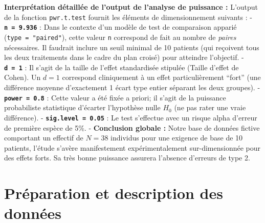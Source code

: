 \documentclass[
  letterpaper,
  DIV=11,
  numbers=noendperiod]{scrartcl}
\begin{document}
\textbf{Interprétation détaillée de l'output de l'analyse de puissance
:} L'output de la fonction \texttt{pwr.t.test} fournit les éléments de
dimensionnement suivants : - \textbf{\texttt{n\ =\ 9.936}} : Dans le
contexte d'un modèle de test de comparaison apparié
(\texttt{type\ =\ "paired"}), cette valeur \texttt{n} correspond de fait
au nombre de \emph{paires} nécessaires. Il faudrait inclure un seuil
minimal de 10 patients (qui reçoivent tous les deux traitements dans le
cadre du plan croisé) pour atteindre l'objectif. -
\textbf{\texttt{d\ =\ 1}} : Il s'agit de la taille de l'effet
standardisée stipulée (Taille d'effet de Cohen). Un \(d=1\) correspond
cliniquement à un effet particulièrement ``fort'' (une différence
moyenne d'exactement 1 écart type entier séparant les deux groupes). -
\textbf{\texttt{power\ =\ 0.8}} : Cette valeur a été fixée a priori; il
s'agit de la puissance probabiliste statistique d'écarter l'hypothèse
nulle \(H_0\) (ne pas rater une vraie différence). -
\textbf{\texttt{sig.level\ =\ 0.05}} : Le test s'effectue avec un risque
alpha d'erreur de première espèce de 5\%. - \textbf{Conclusion globale
:} Notre base de données fictive comportant un effectif de \(N = 38\)
individus pour une exigence de base de 10 patients, l'étude s'avère
manifestement expérimentalement sur-dimensionnée pour des effets forts.
Sa très bonne puissance assurera l'absence d'erreurs de type 2.

\section{Préparation et description des
données}\label{pruxe9paration-et-description-des-donnuxe9es}
\end{document}
